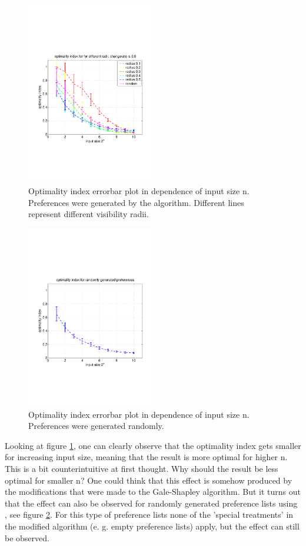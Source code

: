 \documentclass[11pt]{article}
\begin{document}
\begin{figure}[h]
  \includegraphics[trim=0 180 0 180, clip, height=8cm]{../../code/data/2014_12_12_00_55_41/figure_1}
  \caption{Optimality index errorbar plot in dependence of input size n. Preferences were generated by the  algorithm. Different lines represent different visibility radii.}
  \label{fig:optimality1a}
\end{figure}
\begin{figure}[h]
  \includegraphics[trim=0 180 0 180, clip, height=8cm]{../../code/data/2014_12_12_00_55_41/figure_14}
  \caption{Optimality index errorbar plot in dependence of input size n. Preferences were generated randomly.}
  \label{fig:optimality1b}
\end{figure}

Looking at figure \ref{fig:optimality1a}, one can clearly observe that the optimality index gets smaller for increasing input size, meaning that
the result is more optimal for higher n. This is a bit counterintuitive at first thought. Why should the result be less optimal for smaller n?
One could think that this effect is somehow produced by the modifications that were made to the Gale-Shapley algorithm. But it turns
out that the effect can also be observed for randomly generated preference lists using , see figure \ref{fig:optimality1b}.
For this type of preference lists none of the 'special treatments' in the modified algorithm (e. g. empty preference lists) apply, but the
effect can still be observed.
\end{document}
